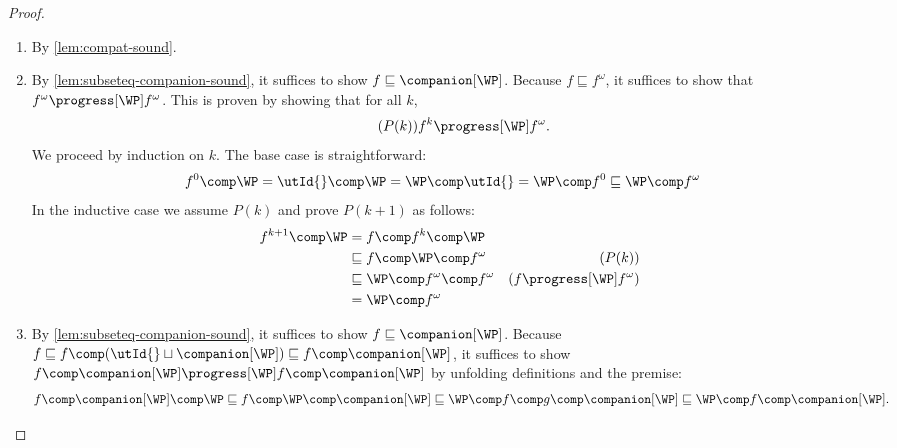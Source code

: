 \begin{proof}~
  \begin{enumerate}
    \item By \cref{lem:compat-sound}.
    \item 
      By \cref{lem:subseteq-companion-sound}, it suffices to show $f \sqsubseteq \companion[\WP]$.
      Because
        $f \sqsubseteq f^\omega$,
      it suffices to show that 
      $f^\omega \progress[\WP] f^\omega$.
      This is proven by showing that for all $k$,
      \begin{equation}\tag{$P(k)$}
        f^k \progress[\WP] f^\omega.
        \end{equation}
      We proceed by induction on $k$. The base case is straightforward:
      \begin{align*}
        f^0\comp\WP&=
         \utId{}\comp\WP =
         \WP\comp \utId{} =
         \WP\comp f^0 \sqsubseteq
         \WP\comp f^\omega
      \end{align*}
In the inductive case we assume $P(k)$ and prove $P(k+1)$ as follows:
      \begin{align*}
        f^{k+1}\comp\WP
        &=
        f\comp f^{k}\comp\WP
        \\&
        \sqsubseteq
        f\comp\WP\comp f^\omega
        &(P(k))
        \\&
        \sqsubseteq
        \WP\comp f^\omega\comp f^\omega
        &(f\progress[\WP]f^\omega)
        \\&
        =
        \WP\comp f^\omega
      \end{align*}

    \item
      By \cref{lem:subseteq-companion-sound}, it suffices to show $f \sqsubseteq \companion[\WP]$.
      Because $f\sqsubseteq f \comp(\utId{}\sqcup\companion[\WP])\sqsubseteq f\comp\companion[\WP]$,
      it suffices to show $f\comp\companion[\WP]\progress[\WP]f\comp\companion[\WP]$ by 
      unfolding definitions and the premise:
      \begin{align*}
        f \comp \companion[\WP] \comp \WP \sqsubseteq
        f \comp \WP \comp \companion[\WP] \sqsubseteq
        \WP\comp f \comp g \comp \companion[\WP] \sqsubseteq
        \WP\comp f \comp \companion[\WP].
      \end{align*}


\end{enumerate}
\end{proof}
